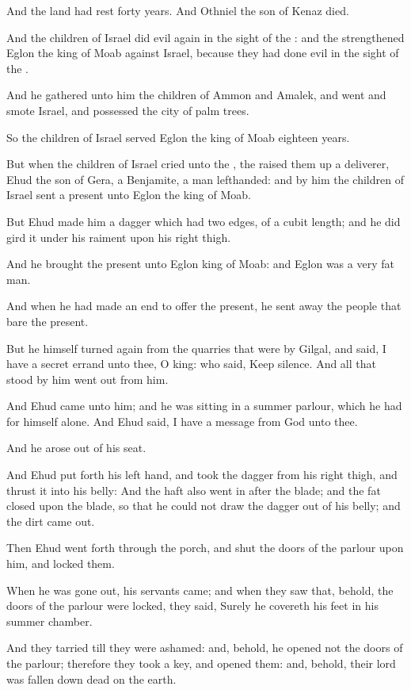 \verse And the land had rest forty years. And Othniel the son of Kenaz died.

\verse And the children of Israel did evil again in the sight of the \LORD: and the \LORD strengthened Eglon the king of Moab against Israel, because they had done evil in the sight of the \LORD.

\verse And he gathered unto him the children of Ammon and Amalek, and went and smote Israel, and possessed the city of palm trees.

\verse So the children of Israel served Eglon the king of Moab eighteen years.

\verse But when the children of Israel cried unto the \LORD, the \LORD raised them up a deliverer, Ehud the son of Gera, a Benjamite, a man lefthanded: and by him the children of Israel sent a present unto Eglon the king of Moab.

\verse But Ehud made him a dagger which had two edges, of a cubit length; and he did gird it under his raiment upon his right thigh.

\verse And he brought the present unto Eglon king of Moab: and Eglon was a very fat man.

\verse And when he had made an end to offer the present, he sent away the people that bare the present.

\verse But he himself turned again from the quarries that were by Gilgal, and said, I have a secret errand unto thee, O king: who said, Keep silence. And all that stood by him went out from him.

\verse And Ehud came unto him; and he was sitting in a summer parlour, which he had for himself alone. And Ehud said, I have a message from God unto thee.

And he arose out of his seat.

\verse And Ehud put forth his left hand, and took the dagger from his right thigh, and thrust it into his belly: \verse And the haft also went in after the blade; and the fat closed upon the blade, so that he could not draw the dagger out of his belly; and the dirt came out.

\verse Then Ehud went forth through the porch, and shut the doors of the parlour upon him, and locked them.

\verse When he was gone out, his servants came; and when they saw that, behold, the doors of the parlour were locked, they said, Surely he covereth his feet in his summer chamber.

\verse And they tarried till they were ashamed: and, behold, he opened not the doors of the parlour; therefore they took a key, and opened them: and, behold, their lord was fallen down dead on the earth.

